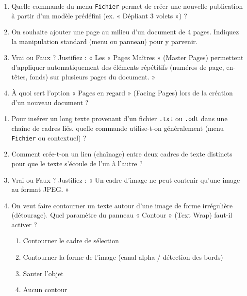 \documentclass[11pt]{article}
\begin{document}
\begin{exercice}
\begin{enumerate}
    \item Quelle commande du menu \texttt{Fichier} permet de créer une nouvelle publication à partir d'un modèle prédéfini (ex. « Dépliant 3 volets ») ?
    \item On souhaite ajouter une page au milieu d'un document de 4 pages. Indiquez la manipulation standard (menu ou panneau) pour y parvenir.
    \item Vrai ou Faux ? Justifiez : « Les « Pages Maîtres » (Master Pages) permettent d'appliquer automatiquement des éléments répétitifs (numéros de page, en-têtes, fonds) sur plusieurs pages du document. »
    \item À quoi sert l'option « Pages en regard » (Facing Pages) lors de la création d'un nouveau document ?
\end{enumerate}
\end{exercice}

\begin{exercice}
\begin{enumerate}
    \item Pour insérer un long texte provenant d'un fichier \texttt{.txt} ou \texttt{.odt} dans une chaîne de cadres liés, quelle commande utilise-t-on généralement (menu \texttt{Fichier} ou contextuel) ?
    \item Comment crée-t-on un lien (chaînage) entre deux cadres de texte distincts pour que le texte s'écoule de l'un à l'autre ?
    \item Vrai ou Faux ? Justifiez : « Un cadre d'image ne peut contenir qu'une image au format JPEG. »
    \item On veut faire contourner un texte autour d'une image de forme irrégulière (détourage). Quel paramètre du panneau « Contour » (Text Wrap) faut-il activer ?
    \begin{enumerate}
        \item Contourner le cadre de sélection
        \item Contourner la forme de l'image (canal alpha / détection des bords)
        \item Sauter l'objet
        \item Aucun contour
    \end{enumerate}
\end{enumerate}
\end{exercice}
\end{document}
